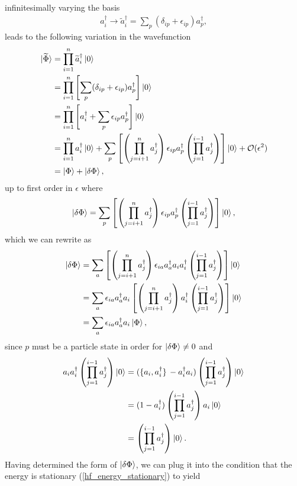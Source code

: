 \documentclass[Dual]{msu-thesis}
\begin{document}
infinitesimally varying the basis
\begin{align}
a^\dagger_i
\to
\widetilde{a}^\dagger_i
=
\sum_p(\delta_{ip}+\epsilon_{ip})a^\dagger_p,
\end{align}
leads to the following variation in the wavefunction
\begin{align}
\ket*{\widetilde{\Phi}}
&=
\prod_{i=1}^n\widetilde{a}^\dagger_i\ket{0}
\\
&=
\prod_{i=1}^n\left[\sum_p(\delta_{ip}+\epsilon_{ip})a^\dagger_p\right]\ket{0}
\\
&=
\prod_{i=1}^n\left[a^\dagger_i+\sum_p\epsilon_{ip}a^\dagger_p\right]\ket{0}
\\
&=
\prod_{i=1}^na^\dagger_i\ket{0}
+
\sum_p\left[\left(\prod_{j=i+1}^na^\dagger_j\right)\epsilon_{ip}a^\dagger_p\left(\prod_{j=1}^{i-1}a^\dagger_j\right)\right]\ket{0}
+
\mathcal{O}(\epsilon^2)
\\
&=
\ket{\Phi}+\ket{\delta{\Phi}},
\end{align}
up to first order in $\epsilon$ where
\begin{align}
\ket{\delta\Phi}
=
\sum_p\left[\left(\prod_{j=i+1}^na^\dagger_j\right)\epsilon_{ip}a^\dagger_p\left(\prod_{j=1}^{i-1}a^\dagger_j\right)\right]\ket{0},
\end{align}
which we can rewrite as
\begin{align}
\ket{\delta\Phi}
&=
\sum_a\left[\left(\prod_{j=i+1}^na^\dagger_j\right)\epsilon_{ia}a^\dagger_aa_ia^\dagger_i\left(\prod_{j=1}^{i-1}a^\dagger_j\right)\right]\ket{0}
\\
&=
\sum_a\epsilon_{ia}a^\dagger_aa_i\left[\left(\prod_{j=i+1}^na^\dagger_j\right)a^\dagger_i\left(\prod_{j=1}^{i-1}a^\dagger_j\right)\right]\ket{0}
\\
&=
\sum_a\epsilon_{ia}a^\dagger_aa_i\ket{\Phi},
\end{align}
since $p$ must be a particle state in order for $\ket{\delta{\Phi}}\neq0$ and
\begin{align}
a_ia^\dagger_i\left(\prod_{j=1}^{i-1}a^\dagger_j\right)\ket{0}
&=
(\acomm*{a_i}{a^\dagger_i}-a^\dagger_ia_i)\left(\prod_{j=1}^{i-1}a^\dagger_j\right)\ket{0}
\nonumber
\\
&=
(1-a^\dagger_i)\left(\prod_{j=1}^{i-1}a^\dagger_j\right)a_i\ket{0}
\nonumber
\\
&=
\left(\prod_{j=1}^{i-1}a^\dagger_j\right)\ket{0}.
\end{align}
Having determined the form of $\ket{\delta{\Phi}}$, we can plug it into the condition that the energy is stationary (\ref{hf_energy_stationary}) to yield
\end{document}
